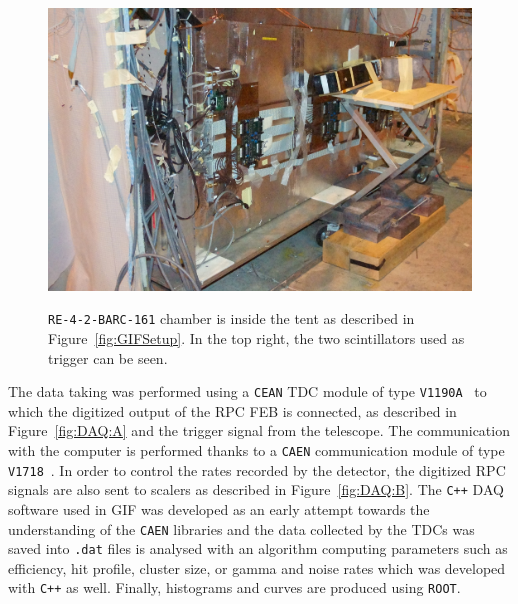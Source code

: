 \begingroup\setlength{\intextsep}{5pt}\setlength{\columnsep}{15pt}
	
	\begin{figure}
		\centering
		\includegraphics[width = \linewidth]{fig/chapt5/GIF-RPCSetup.jpg}\\
		\caption{\label{fig:GIF-RPCSetup} \texttt{RE-4-2-BARC-161} chamber is inside the tent as described in Figure~\ref{fig:GIFSetup}. In the top right, the two scintillators used as trigger can be seen.}
	\end{figure}
	
	The data taking was performed using a \texttt{CEAN} TDC module of type \texttt{V1190A}~\cite{V1190AMUT} to which the digitized output of the RPC \acl{FEB} is connected, as described in Figure~\ref{fig:DAQ:A} and the trigger signal from the telescope. The communication with the computer is performed thanks to a \texttt{CAEN} communication module of type \texttt{V1718}~\cite{V1718MUT}. In order to control the rates recorded by the detector, the digitized RPC signals are also sent to scalers as described in Figure~\ref{fig:DAQ:B}. The \texttt{C++} DAQ software used in GIF was developed as an early attempt towards the understanding of the \texttt{CAEN} libraries and the data collected by the TDCs was saved into \texttt{.dat} files is analysed with an algorithm computing parameters such as efficiency, hit profile, cluster size, or gamma and noise rates which was developed with \texttt{C++} as well. Finally, histograms and curves are produced using \texttt{ROOT}.

\endgroup
\newpage
	
\begingroup\setlength{\intextsep}{10pt}\setlength{\columnsep}{15pt}
	
